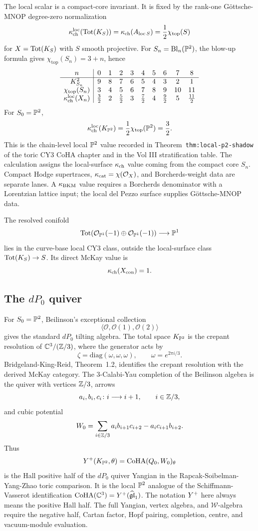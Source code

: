 The local scalar is a compact-core invariant. It is fixed by the
rank-one G\"ottsche-MNOP degree-zero normalization
\[
  \kch^{\mathrm{loc}}\!\left(\Tot(K_S)\right)
  =
  \kch(A_{\mathrm{loc}\,S})
  =
  \frac{1}{2}\chi_{\mathrm{top}}(S)
\]
for \(X=\Tot(K_S)\) with \(S\) smooth projective. For
\(S_n=\mathrm{Bl}_n(\P^2)\), the blow-up formula gives
\(\chi_{\mathrm{top}}(S_n)=3+n\), hence
\[
\begin{array}{c|ccccccccc}
n&0&1&2&3&4&5&6&7&8\\ \hline
K_{S_n}^{2}&9&8&7&6&5&4&3&2&1\\
\chi_{\mathrm{top}}(S_n)&3&4&5&6&7&8&9&10&11\\
\kch^{\mathrm{loc}}(X_n)&\frac32&2&\frac52&3&\frac72&4&\frac92&5&\frac{11}{2}
\end{array}
\]
For \(S_0=\P^2\),
\[
  \kch^{\mathrm{loc}}(K_{\P^2})
  =
  \frac{1}{2}\chi_{\mathrm{top}}(\P^2)
  =
  \frac{3}{2}.
\]
This is the chain-level local \(\P^2\) value recorded in
Theorem~\texttt{thm:local-p2-shadow} of the toric CY3 CoHA chapter and
in the Vol III stratification table. The calculation assigns the
local-surface \(\kch\) value coming from the compact core \(S_n\).
Compact Hodge supertraces, \(\kcat=\chi(\mathcal O_X)\), and
Borcherds-weight data are separate lanes. A \(\kBKM\) value requires a
Borcherds denominator with a Lorentzian lattice input; the local del
Pezzo surface supplies G\"ottsche-MNOP data.

The resolved conifold
\[
  \Tot(\mathcal O_{\P^1}(-1)\oplus \mathcal O_{\P^1}(-1))
  \longrightarrow \P^1
\]
lies in the curve-base local CY3 class, outside the local-surface class
\(\Tot(K_S)\to S\). Its direct McKay value is
\[
  \kch(X_{\mathrm{con}})=1.
\]

\subsection*{The \(dP_0\) quiver}

For \(S_0=\P^2\), Beilinson's exceptional collection
\[
  \langle \mathcal O,\mathcal O(1),\mathcal O(2)\rangle
\]
gives the standard \(dP_0\) tilting algebra. The total space
\(K_{\P^2}\) is the crepant resolution of
\(\C^3/(\Z/3)\), where the generator acts by
\[
  \zeta=\mathrm{diag}(\omega,\omega,\omega),
  \qquad
  \omega=e^{2\pi i/3}.
\]
Bridgeland-King-Reid, Theorem~1.2, identifies the crepant resolution
with the derived McKay category. The \(3\)-Calabi-Yau completion of the
Beilinson algebra is the quiver with vertices \(\Z/3\), arrows
\[
  a_i,b_i,c_i\colon i\longrightarrow i+1,
  \qquad i\in\Z/3,
\]
and cubic potential
\[
  W_0
  =
  \sum_{i\in\Z/3}
  a_i b_{i+1} c_{i+2}
  -
  a_i c_{i+1} b_{i+2}.
\]
Thus
\[
  \Yp(K_{\P^2},\theta)
  =
  \CoHA(Q_0,W_0)_\theta
\]
is the Hall positive half of the \(dP_0\) quiver Yangian in the
Rapcak-Soibelman-Yang-Zhao toric comparison. It is the local
\(\P^2\) analogue of the Schiffmann-Vasserot identification
\(\CoHA(\C^3)=Y^+(\widehat{\mathfrak{gl}}_1)\). The notation
\(\Yp\) here always means the positive Hall half. The full Yangian,
vertex algebra, and \(\mathcal W\)-algebra require the negative half,
Cartan factor, Hopf pairing, completion, centre, and vacuum-module
evaluation.

